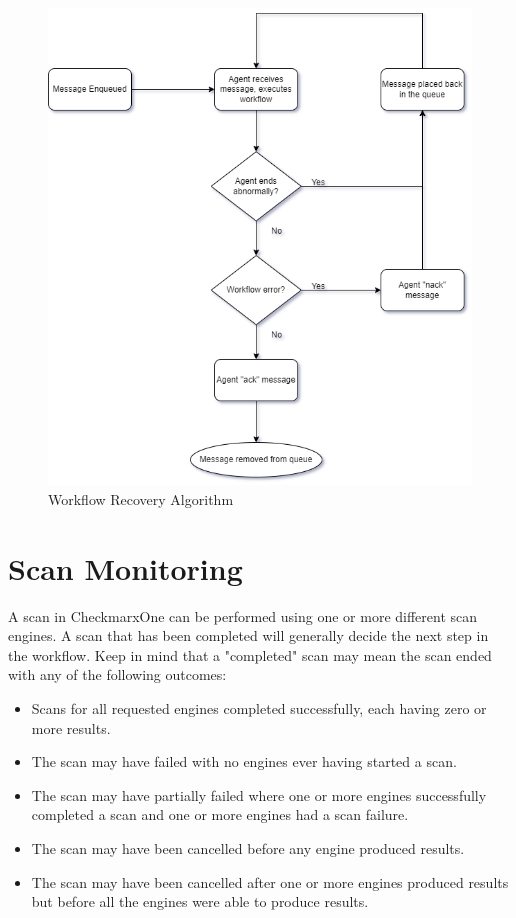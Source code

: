 \begin{figure}[ht]
    \includegraphics[width=\textwidth]{graphics/cxoneflow-diagrams-Recovery Algorithm.png}
    \caption{Workflow Recovery Algorithm}
    \label{fig:recovery-flowchart}
\end{figure}



\section{Scan Monitoring}

A scan in CheckmarxOne can be performed using one or more different scan engines.
A scan that has been completed will generally decide the next step in the workflow.
Keep in mind that a "completed" scan may mean the scan ended with any of the
following outcomes:

\begin{itemize}
    \item Scans for all requested engines completed successfully, each having zero
    or more results.
    \item The scan may have failed with no engines ever having started a scan.
    \item The scan may have partially failed where one or more engines successfully
    completed a scan and one or more engines had a scan failure.
    \item The scan may have been cancelled before any engine produced results.
    \item The scan may have been cancelled after one or more engines produced
    results but before all the engines were able to produce results.
\end{itemize}

